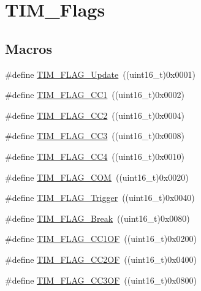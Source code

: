 \hypertarget{group___t_i_m___flags}{}\section{T\+I\+M\+\_\+\+Flags}
\label{group___t_i_m___flags}
\subsection*{Macros}
\begin{DoxyCompactItemize}
\item 
\#define \mbox{\hyperlink{group___t_i_m___flags_ga97eba66f792c88e08131bd0d2a0e530d}{T\+I\+M\+\_\+\+F\+L\+A\+G\+\_\+\+Update}}~((uint16\+\_\+t)0x0001)
\item 
\#define \mbox{\hyperlink{group___t_i_m___flags_gaa7eb8be054b9bd217a9abb1c8687cc55}{T\+I\+M\+\_\+\+F\+L\+A\+G\+\_\+\+C\+C1}}~((uint16\+\_\+t)0x0002)
\item 
\#define \mbox{\hyperlink{group___t_i_m___flags_ga9cae242f1c51b31839ffc5bc007c82a7}{T\+I\+M\+\_\+\+F\+L\+A\+G\+\_\+\+C\+C2}}~((uint16\+\_\+t)0x0004)
\item 
\#define \mbox{\hyperlink{group___t_i_m___flags_ga052c380f922219659810e4fceb574a7c}{T\+I\+M\+\_\+\+F\+L\+A\+G\+\_\+\+C\+C3}}~((uint16\+\_\+t)0x0008)
\item 
\#define \mbox{\hyperlink{group___t_i_m___flags_gafd0dc57b56941f8b8250d66e289542db}{T\+I\+M\+\_\+\+F\+L\+A\+G\+\_\+\+C\+C4}}~((uint16\+\_\+t)0x0010)
\item 
\#define \mbox{\hyperlink{group___t_i_m___flags_gad454d70205ce5bbf3b3c0e7e43d6df62}{T\+I\+M\+\_\+\+F\+L\+A\+G\+\_\+\+C\+OM}}~((uint16\+\_\+t)0x0020)
\item 
\#define \mbox{\hyperlink{group___t_i_m___flags_gaeca2f17eea738dbec7eee8ecbe442814}{T\+I\+M\+\_\+\+F\+L\+A\+G\+\_\+\+Trigger}}~((uint16\+\_\+t)0x0040)
\item 
\#define \mbox{\hyperlink{group___t_i_m___flags_ga166571a1d5ca2bfca5d923eaa22f6deb}{T\+I\+M\+\_\+\+F\+L\+A\+G\+\_\+\+Break}}~((uint16\+\_\+t)0x0080)
\item 
\#define \mbox{\hyperlink{group___t_i_m___flags_ga38dfb7d1ed00af77d70bc3be28500108}{T\+I\+M\+\_\+\+F\+L\+A\+G\+\_\+\+C\+C1\+OF}}~((uint16\+\_\+t)0x0200)
\item 
\#define \mbox{\hyperlink{group___t_i_m___flags_ga4df0c71d3e695c214d49802942e04590}{T\+I\+M\+\_\+\+F\+L\+A\+G\+\_\+\+C\+C2\+OF}}~((uint16\+\_\+t)0x0400)
\item 
\#define \mbox{\hyperlink{group___t_i_m___flags_gac81f24eaffdf83c2db9d2e6078a00919}{T\+I\+M\+\_\+\+F\+L\+A\+G\+\_\+\+C\+C3\+OF}}~((uint16\+\_\+t)0x0800)

\end{DoxyCompactItemize}
